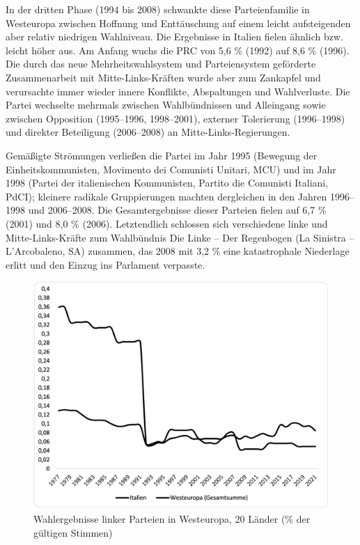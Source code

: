 \begin{multicols*}{2}
In der dritten Phase (1994 bis 2008) schwankte diese Parteienfamilie in Westeuropa zwischen Hoffnung und Enttäuschung auf einem leicht aufsteigenden aber relativ niedrigen Wahlniveau. Die Ergebnisse in Italien fielen ähnlich bzw. leicht höher aus. Am Anfang wuchs die PRC von 5,6 \% (1992) auf 8,6 \% (1996). Die durch das neue Mehrheitswahlsystem und Parteiensystem geförderte Zusammenarbeit mit Mitte-\-Links-\-Kräften wurde aber zum Zankapfel und verursachte immer wieder innere Konflikte, Abspaltungen und Wahlverluste. Die Partei wechselte mehrmals zwischen Wahlbündnissen und Alleingang sowie zwischen Opposition (1995–1996, 1998–2001), externer Tolerierung (1996–1998) und direkter Beteiligung (2006–2008) an Mitte-\-Links-\-Regierungen. 

Gemäßigte Strömungen verließen die Partei im Jahr 1995 (Bewegung der Einheitskommunisten, Movimento dei Comunisti Unitari, MCU) und im Jahr 1998 (Partei der italienischen Kommunisten, Partito die Comunisti Italiani, PdCI); kleinere radikale Gruppierungen machten dergleichen in den Jahren 1996–1998 und 2006–2008. Die  Gesamtergebnisse dieser Parteien fielen auf 6,7 \% (2001) und 8,0 \% (2006). Letztendlich schlossen sich verschiedene linke und Mitte-Links-Kräfte zum Wahlbündnis Die Linke – Der Regenbogen (La Sinistra – L’Arcobaleno, SA) zusammen, das 2008 mit 3,2 \% eine katastrophale Niederlage erlitt und den Einzug ins Parlament verpasste.

\begin{figure}
    \caption{Wahlergebnisse linker Parteien in Westeuropa, 20 Länder (\% der gültigen Stimmen)}
    \centering
    \includegraphics[scale=0.7]{grafik-wahlergebnisse.png}
\end{figure}


\end{multicols*}
